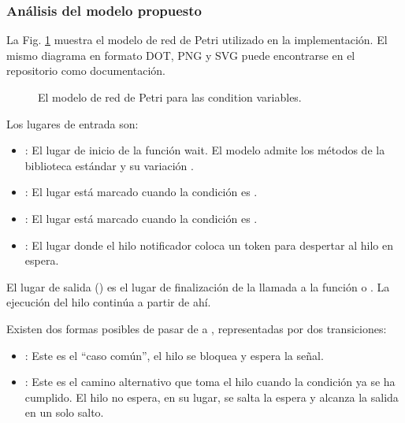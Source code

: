 \subsubsection{Análisis del modelo propuesto}

La Fig. \ref{fig:condition-variable-model} muestra el modelo de red de Petri utilizado en la implementación.
El mismo diagrama en formato DOT, PNG y SVG puede encontrarse en el repositorio como documentación.

\begin{figure}[!htbp]
      \centering
      
      \caption{El modelo de red de Petri para las condition variables.}
      \label{fig:condition-variable-model}
\end{figure}

Los lugares de entrada son:

\begin{itemize}
      \item {}: El lugar de inicio de la función wait.
            El modelo admite los métodos de la biblioteca estándar 
            y su variación .
      \item {}: El lugar está marcado cuando la condición es .
      \item {}: El lugar está marcado cuando la condición es .
      \item {}: El lugar donde el hilo notificador coloca un token para despertar al hilo en espera.
\end{itemize}

El lugar de salida () es
el lugar de finalización de la llamada
a la función  o .
La ejecución del hilo continúa a partir de ahí.

Existen dos formas posibles de pasar de  a , representadas por dos transiciones:

\begin{itemize}
      \item {}: Este es el ``caso común'', el hilo se bloquea y espera la señal.
      \item {}: Este es el camino alternativo que toma el hilo cuando la condición ya se ha cumplido.
            El hilo no espera, en su lugar, se salta la espera y alcanza la salida  en un solo salto.
\end{itemize}

